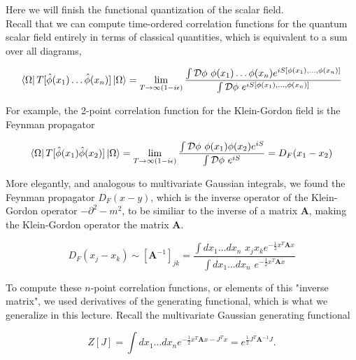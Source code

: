 
\noindent Here we will finish the functional quantization of the scalar field. \\

\noindent Recall that we can compute time-ordered correlation functions for the quantum scalar field entirely in terms of classical quantities, which is equivalent to a sum over all diagrams,

\begin{equation}
\bra{\Omega} T[ \hat{\phi} (x_1) \dots \hat{\phi} (x_n) ] \ket{\Omega} = \lim_{T \rightarrow \infty(1-i\epsilon)} \frac{\int \mathcal{D} \phi \,\, \phi(x_1) \dots \phi(x_n) e^{i S[\phi(x_1), \dots , \phi (x_n)]}}{\int \mathcal{D} \phi \,\, e^{i S[\phi(x_1), \dots , \phi (x_n)]}}
\end{equation}

\noindent For example, the 2-point correlation function for the Klein-Gordon field is the Feynman propagator

\begin{equation}
\bra{\Omega} T[ \hat{\phi} (x_1) \hat{\phi} (x_2) ] \ket{\Omega} = \lim_{T \rightarrow \infty(1-i\epsilon)} \frac{\int \mathcal{D} \phi \,\, \phi(x_1) \phi(x_2) e^{i S}}{\int \mathcal{D} \phi \,\, e^{i S}} = D_F (x_1 - x_2)
\end{equation}

\noindent More elegantly, and analogous to multivariate Gaussian integrals, we found the Feynman propagator $D_F (x-y)$, which is the inverse operator of the Klein-Gordon operator $-\partial^2 - m^2$, to be similiar to the inverse of a matrix $\textbf{A}$, making the Klein-Gordon operator the matrix $\textbf{A}$. 

\begin{equation}
D_F (x_j - x_k) \sim [\textbf{A}^{-1}]_{jk} = \frac{\int dx_1 \dots dx_n \,\, x_j x_k e^{-\frac{1}{2} x^T \textbf{A} x} }{\int dx_1 \dots dx_n \,\, e^{-\frac{1}{2} x^T \textbf{A} x}}
\end{equation}

\noindent To compute these $n$-point correlation functions, or elements of this "inverse matrix", we used derivatives of the generating functional, which is what we generalize in this lecture. Recall the multivariate Gaussian generating functional

\begin{equation}
Z[J] = \int dx_1 \dots dx_n e^{ -\frac{1}{2} x^T \textbf{A} x - J^T x } = e^{ \frac{1}{2} J^T \textbf{A}^{-1} J }.
\end{equation}

